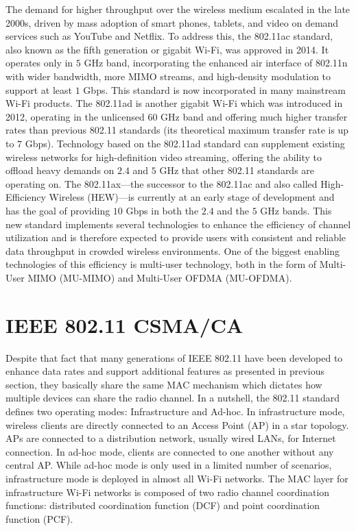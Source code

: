 The demand for higher throughput over the wireless medium escalated in the late 2000s, driven by mass adoption of smart phones, tablets, and video on demand services such as YouTube and Netflix. To address this, the 802.11ac standard, also known as the fifth generation or gigabit Wi-Fi, was approved in 2014. It operates only in $5$ GHz band, incorporating the enhanced air interface of 802.11n with wider bandwidth, more MIMO streams, and high-density modulation to support at least $1$ Gbps. This standard is now incorporated in many mainstream Wi-Fi products. The 802.11ad is another gigabit Wi-Fi which was introduced in 2012, operating in the unlicensed $60$ GHz band and offering much higher transfer rates than previous 802.11 standards (its theoretical maximum transfer rate is up to $7$ Gbps). Technology based on the 802.11ad standard can supplement existing wireless networks for high-definition video streaming, offering the ability to offload heavy demands on $2.4$ and $5$ GHz that other 802.11 standards are operating on. The 802.11ax---the successor to the 802.11ac and also called  High-Efficiency Wireless (HEW)---is currently at an early stage of development and has the goal of providing $10$ Gbps in both the $2.4$ and the $5$ GHz bands. This new standard implements several technologies to enhance the efficiency of channel utilization and is therefore expected to provide users with consistent and reliable data throughput in crowded wireless environments. One of the biggest enabling technologies of this efficiency is multi-user technology, both in the form of Multi-User MIMO (MU-MIMO) and Multi-User OFDMA (MU-OFDMA).


\section{IEEE 802.11 CSMA/CA}
\label{csma}

Despite that fact that many generations of IEEE 802.11 have been developed to enhance data rates and support additional features as presented in previous section, they basically share the same MAC mechanism which dictates how multiple devices can share the radio channel. In a nutshell, the 802.11 standard defines two operating modes: Infrastructure and Ad-hoc. In infrastructure mode, wireless clients are directly connected to an Access Point (AP) in a star topology. APs are connected to a distribution network, usually wired LANs, for Internet connection. In ad-hoc mode, clients are connected to one another without any central AP. While ad-hoc mode is only used in a limited number of scenarios, infrastructure mode is deployed in almost all Wi-Fi networks. The MAC layer for  infrastructure Wi-Fi networks is composed of two radio channel coordination functions: distributed coordination function (DCF) and point coordination function (PCF).


